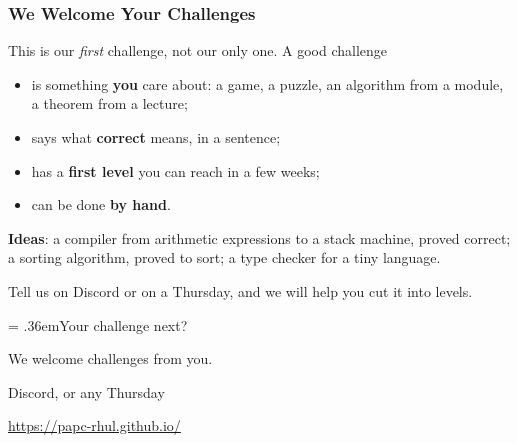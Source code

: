 \begin{frame}
  \frametitle{We Welcome Your Challenges}
  This is our \emph{first} challenge, not our only one. A good challenge
  \begin{itemize}
    \item is something \textbf{you} care about: a game, a puzzle, an
      algorithm from a module, a theorem from a lecture;
    \item says what \textbf{correct} means, in a sentence;
    \item has a \textbf{first level} you can reach in a few weeks;
    \item can be done \textbf{by hand}.
  \end{itemize}
  \textbf{Ideas}: a compiler from arithmetic expressions to a stack
  machine, proved correct; a sorting algorithm, proved to sort; a type
  checker for a tiny language.
  \par\medskip
  Tell us on Discord or on a Thursday, and we will help you cut it into
  levels.
\end{frame}

\begin{frame}
  \thispagestyle{talknofooter}
  \vfill
  \begin{center}
    \begin{minipage}{.75\textwidth}
      \begin{sticky}[halign = center]
        {\Huge\spaceskip = .36em\relax Your challenge next?\par}
        \bigskip
        {\large We welcome challenges from you.\par}
        \medskip
        Discord, or any Thursday\par
        \smallskip
        \url{https://papc-rhul.github.io/}\par
      \end{sticky}
    \end{minipage}
  \end{center}
  \vfill
\end{frame}
